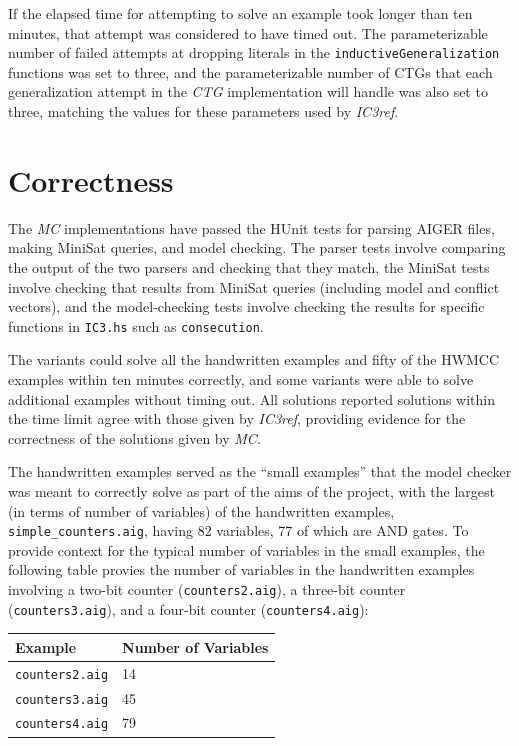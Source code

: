 \documentclass[12pt,a4paper,twoside,openright]{report}
\begin{document}
{If the elapsed time for attempting to solve an example took longer than ten minutes, that
attempt was considered to have timed out. The parameterizable number of failed attempts
at dropping literals in the \verb,inductiveGeneralization, functions was set to
three, and the parameterizable number of CTGs that each generalization attempt
in the {\it CTG} implementation will handle was also set to three, matching the
values for these parameters used by \emph{IC3ref}.

\section{Correctness}
\label{eval:solving}

The \emph{MC} implementations have passed the HUnit tests for parsing AIGER files,
making MiniSat queries, and model checking. The parser tests involve comparing
the output of the two parsers and checking that they match, the MiniSat tests
involve checking that results from MiniSat queries (including model and conflict
vectors), and the model-checking tests involve checking the results for specific
functions in \verb,IC3.hs, such as \verb,consecution,.

The variants could solve all the handwritten examples and fifty of the HWMCC examples within
ten minutes correctly, and some
variants were able to solve additional examples without timing out.
All solutions reported solutions within the time limit agree with those
given by \emph{IC3ref}, providing evidence for the correctness of the solutions given
by \emph{MC}.

The handwritten examples served as the ``small examples'' that the model checker
was meant to correctly solve as part of the aims of the project, with the largest
(in terms of number of variables) of the handwritten examples,
\verb,simple_counters.aig,, having 82 variables, 77 of which are AND gates.
To provide context for the typical number of variables in the small examples,
the following table provies the number of variables in the handwritten examples involving
a two-bit counter (\verb,counters2.aig,), a three-bit counter (\verb,counters3.aig,),
and a four-bit counter (\verb,counters4.aig,):
\begin{center}
\begin{tabular}{|l | l|}
\hline
Example & Number of Variables \\
\hline
{\tt counters2.aig} & 14\\
{\tt counters3.aig} & 45\\
{\tt counters4.aig} & 79\\
\hline
\end{tabular}
\end{center}

}
\end{document}
